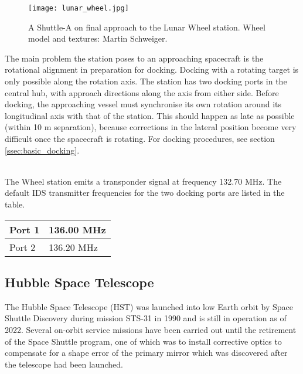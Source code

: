 \documentclass[Orbiter User Manual.tex]{subfiles}
\begin{document}
\begin{figure}[H]
  \centering
  \texttt{[image: lunar\_wheel.jpg]}
  \caption{A Shuttle-A on final approach to the Lunar Wheel station. Wheel model and textures: Martin Schweiger.}
\end{figure}

\noindent
The main problem the station poses to an approaching spacecraft is the rotational alignment in preparation for docking. Docking with a rotating target is only possible along the rotation axis. The station has two docking ports in the central hub, with approach directions along the axis from either side. Before docking, the approaching vessel must synchronise its own rotation around its longitudinal axis with that of the station. This should happen as late as possible (within 10 m separation), because corrections in the lateral position become very difficult once the spacecraft is rotating. For docking procedures, see section \ref{ssec:basic_docking}.\\


\noindent
\\
The Wheel station emits a transponder signal at frequency 132.70 MHz. The default IDS transmitter frequencies for the two docking ports are listed in the table.

	\begin{longtable}{ |p{}|p{}| }
	\hline\rule{0pt}{2ex}
	Port 1 & 136.00  MHz\\
	\hline\rule{0pt}{2ex}
	Port 2 & 136.20  MHz\\
	\hline
	\end{longtable}


\subsection{Hubble Space Telescope}
The Hubble Space Telescope (HST) was launched into low Earth orbit by Space Shuttle Discovery during mission STS-31 in 1990 and is still in operation as of 2022. Several on-orbit service missions have been carried out until the retirement of the Space Shuttle program, one of which was to install corrective optics to compensate for a shape error of the primary mirror which was discovered after the telescope had been launched.
\end{document}
